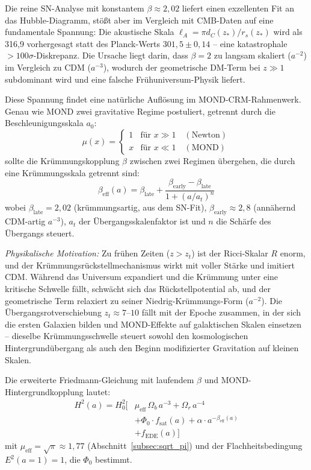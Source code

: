 \documentclass[aps,prd,twocolumn,superscriptaddress,nofootinbib,floatfix]{revtex4-2}
\begin{document}
Die reine SN-Analyse mit konstantem $\beta \approx 2{,}02$ liefert einen exzellenten Fit an das Hubble-Diagramm, stößt aber im Vergleich mit CMB-Daten auf eine fundamentale Spannung: Die akustische Skala $\ell_A = \pi d_C(z_*)/r_s(z_*)$ wird als 316,9 vorhergesagt statt des Planck-Werts $301{,}5 \pm 0{,}14$ -- eine katastrophale $>100\sigma$-Diskrepanz. Die Ursache liegt darin, dass $\beta = 2$ zu langsam skaliert ($a^{-2}$) im Vergleich zu CDM ($a^{-3}$), wodurch der geometrische DM-Term bei $z \gg 1$ subdominant wird und eine falsche Frühuniversum-Physik liefert.

Diese Spannung findet eine natürliche Auflösung im MOND-CRM-Rahmenwerk. Genau wie MOND zwei gravitative Regime postuliert, getrennt durch die Beschleunigungsskala $a_0$:
\begin{equation}
\mu(x) = \begin{cases} 1 & \text{für } x \gg 1 \quad (\text{Newton}) \\ x & \text{für } x \ll 1 \quad (\text{MOND}) \end{cases}
\end{equation}
sollte die Krümmungskopplung $\beta$ zwischen zwei Regimen übergehen, die durch eine Krümmungsskala getrennt sind:
\begin{equation}
\beta_{\mathrm{eff}}(a) = \beta_{\mathrm{late}} + \frac{\beta_{\mathrm{early}} - \beta_{\mathrm{late}}}{1 + (a/a_t)^n}
\label{eq:running_beta}
\end{equation}
wobei $\beta_{\mathrm{late}} = 2{,}02$ (krümmungsartig, aus dem SN-Fit), $\beta_{\mathrm{early}} \approx 2{,}8$ (annähernd CDM-artig $a^{-3}$), $a_t$ der Übergangsskalenfaktor ist und $n$ die Schärfe des Übergangs steuert.

\textit{Physikalische Motivation:} Zu frühen Zeiten ($z > z_t$) ist der Ricci-Skalar $R$ enorm, und der Krümmungsrückstellmechanismus wirkt mit voller Stärke und imitiert CDM. Während das Universum expandiert und die Krümmung unter eine kritische Schwelle fällt, schwächt sich das Rückstellpotential ab, und der geometrische Term relaxiert zu seiner Niedrig-Krümmungs-Form ($a^{-2}$). Die Übergangsrotverschiebung $z_t \approx 7\text{--}10$ fällt mit der Epoche zusammen, in der sich die ersten Galaxien bilden und MOND-Effekte auf galaktischen Skalen einsetzen -- dieselbe Krümmungsschwelle steuert sowohl den kosmologischen Hintergrundübergang als auch den Beginn modifizierter Gravitation auf kleinen Skalen.

Die erweiterte Friedmann-Gleichung mit laufendem $\beta$ und MOND-Hintergrundkopplung lautet:
\begin{equation}
\begin{split}
H^2(a) = H_0^2 \Big[&\mu_{\mathrm{eff}}\,\Omega_b\,a^{-3} + \Omega_r\,a^{-4} \\
&+ \Phi_0 \cdot f_{\mathrm{sat}}(a) + \alpha \cdot a^{-\beta_{\mathrm{eff}}(a)} \\
&+ f_{\mathrm{EDE}}(a)\Big]
\end{split}
\label{eq:running_friedmann}
\end{equation}
mit $\mu_{\mathrm{eff}} = \sqrt{\pi} \approx 1{,}77$ (Abschnitt~\ref{subsec:sqrt_pi}) und der Flachheitsbedingung $E^2(a{=}1) = 1$, die $\Phi_0$ bestimmt.
\end{document}
